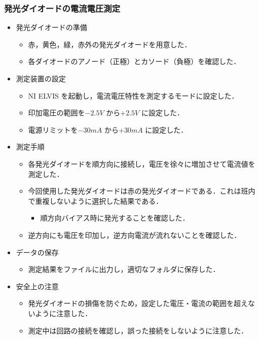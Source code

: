 \documentclass{ltjsarticle}
\begin{document}
\subsubsection{発光ダイオードの電流電圧測定}
\begin{itemize}
  \item 発光ダイオードの準備
  \begin{itemize}
    \item 赤，黄色，緑，赤外の発光ダイオードを用意した．
    \item 各ダイオードのアノード（正極）とカソード（負極）を確認した．  
  \end{itemize}
  \item 測定装置の設定
  \begin{itemize}
    \item NI ELVIS を起動し，電流電圧特性を測定するモードに設定した．
    \item 印加電圧の範囲を${-2.5 V}$ から${+2.5 V}$ に設定した．
    \item 電源リミットを${-30 mA}$ から${+30 mA}$ に設定した．
  \end{itemize}
  \item 測定手順
  \begin{itemize}
    \item 各発光ダイオードを順方向に接続し，電圧を徐々に増加させて電流値を測定した．
    \item 今回使用した発光ダイオードは赤の発光ダイオードである．これは班内で重複しないように選択した結果である．
    \begin{itemize}
      \item 順方向バイアス時に発光することを確認した．
    \end{itemize}
    \item 逆方向にも電圧を印加し，逆方向電流が流れないことを確認した．
  \end{itemize}
  \item データの保存
  \begin{itemize}
    \item 測定結果をファイルに出力し，適切なフォルダに保存した．
  \end{itemize}
  \item 安全上の注意
  \begin{itemize}
    \item 発光ダイオードの損傷を防ぐため，設定した電圧・電流の範囲を超えないように注意した．
    \item 測定中は回路の接続を確認し，誤った接続をしないように注意した． 
  \end{itemize}
\end{itemize}
\end{document}
